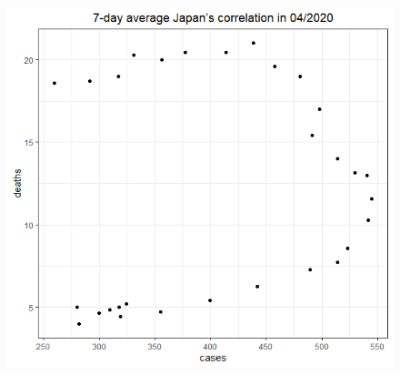 \documentclass[a4paper]{article}
\theoremstyle{definition}
\begin{document}
\begin{enumerate}[1)]
\begin{figure}[H]
\begin{center}
        \includegraphics[scale = 0.3]{ix/ix.3/JPN_04_2020.png}
        

\end{center}
\end{figure}
\end{enumerate}
\end{document}
